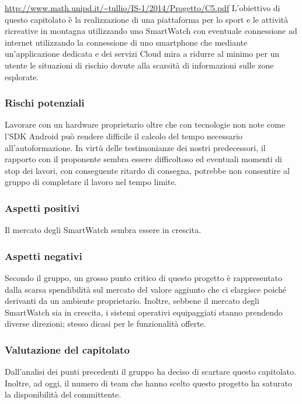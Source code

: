 \url{http://www.math.unipd.it/~tullio/IS-1/2014/Progetto/C5.pdf}
L’obiettivo di questo capitolato è la realizzazione di una piattaforma per lo sport e le attività ricreative in montagna utilizzando uno SmartWatch con eventuale connessione ad internet utilizzando la connessione di uno smartphone che mediante un’applicazione dedicata e dei servizi Cloud mira a ridurre al minimo per un utente le situazioni di rischio dovute alla scarsità di informazioni sulle zone esplorate.
\subsubsection{Rischi potenziali}
Lavorare con un hardware proprietario oltre che con tecnologie non note come l’SDK Android può rendere difficile il calcolo del tempo necessario all’autoformazione.
In virtù delle testimonianze dei nostri predecessori, il rapporto con il proponente sembra essere difficoltoso ed eventuali momenti di stop dei lavori, con conseguente ritardo di consegna, potrebbe non consentire al gruppo di completare il lavoro nel tempo limite.
\subsubsection{Aspetti positivi}
Il mercato degli SmartWatch sembra essere in crescita.
\subsubsection{Aspetti negativi}
Secondo il gruppo, un grosso punto critico di questo progetto è rappresentato dalla scarsa spendibilità sul mercato del valore aggiunto che ci elargisce poiché derivanti da un ambiente proprietario. Inoltre, sebbene il mercato degli SmartWatch sia in crescita, i sistemi operativi equipaggiati stanno prendendo diverse direzioni; stesso dicasi per le funzionalità offerte.
\subsubsection{Valutazione del capitolato}
Dall’analisi dei punti precedenti il gruppo ha deciso di scartare questo capitolato.
Inoltre, ad oggi, il numero di team che hanno scelto questo progetto ha saturato la disponibilità del committente.
